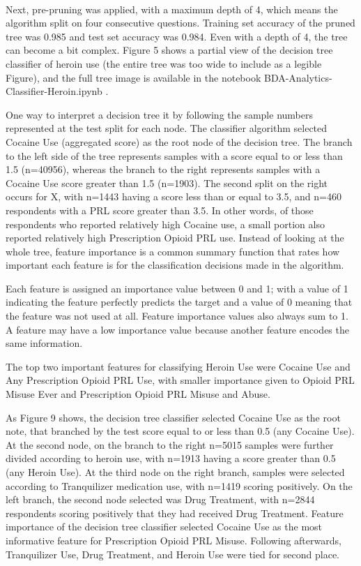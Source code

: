 \\\documentclass[sigconf]{acmart}
\begin{document}
Next, pre-pruning was applied, with 
a maximum depth of 4, which means the algorithm split on four consecutive
questions. Training set accuracy of the pruned tree was 0.985 and test set
accuracy was 0.984. Even with a depth of 4, the tree can become a bit complex.
Figure 5 shows a partial view of the decision tree classifier of heroin use 
(the entire tree was too wide to include as a legible Figure), and the full 
tree image is available in the notebook BDA-Analytics-Classifier-Heroin.ipynb 
\cite{classifyH}. 

One way to interpret a decision tree it by following the sample numbers 
represented at the test split for each node. The classifier algorithm 
selected Cocaine Use (aggregated score) as the root node of the decision tree. 
The branch to the left  side of the tree represents samples with a score equal 
to or less than 1.5 (n=40956), whereas the branch to the right represents 
samples with a Cocaine Use score greater than 1.5 (n=1903). The second split 
on the right occurs for X, with n=1443 having a score less than or equal 
to 3.5, and n=460 respondents with a PRL score greater than 3.5. In other 
words, of those respondents who reported relatively high Cocaine use, a small
portion also reported relatively high Prescription Opioid PRL use. Instead of 
looking at the whole tree, feature importance is a common summary function 
that rates how important each feature is for the classification decisions 
made in the algorithm. 

Each feature is assigned an importance value between 0 and 1; with a value of 
1 indicating the feature perfectly predicts the target and a value of 0 meaning 
that the feature was not used at all. Feature importance values also always 
sum to 1. A feature may have a low importance value because another feature 
encodes the same information. 

The top two important features for classifying Heroin Use were Cocaine Use 
and Any Prescription Opioid PRL Use, with smaller importance given to Opioid 
PRL Misuse Ever and Prescription Opioid PRL Misuse and Abuse. 



As Figure 9 shows, the decision tree classifier
selected Cocaine Use as the root note, that branched by the test score equal
to or less than 0.5 (any Cocaine Use). At the second node, on the branch to 
the right n=5015 samples were further divided according to heroin use, with 
n=1913 having a score greater than 0.5 (any Heroin Use). At the third node
on the right branch, samples were selected according to Tranquilizer
medication use, with n=1419 scoring positively. On the left branch, the 
second node selected was Drug Treatment, with n=2844 respondents scoring
positively that they had received Drug Treatment. Feature importance of
the decision tree classifier selected Cocaine Use as the most informative
feature for Prescription Opioid PRL Misuse. Following afterwards, 
Tranquilizer Use, Drug Treatment, and Heroin Use were tied for second place. 
\end{document}
